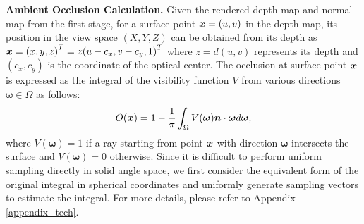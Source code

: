 \documentclass{article} %
\begin{document}
\textbf{Ambient Occlusion Calculation.}\label{occ} Given the rendered depth map and normal map from the first stage, for a surface point ${\bm{x}} =(u,v)$ in the depth map, its position in the view space $(X, Y, Z)$ can be obtained from its depth as ${\bm{x}}={(x,y,z)}^T = z{(u-c_x, v-c_y, 1)}^T$
where $z=d(u,v)$ represents its depth and $(c_x,c_y)$ is the coordinate of the optical center. The occlusion at surface point ${\bm{x}}$ is expressed as the integral of the visibility function $V$ from various directions $\bm{\omega} \in \Omega$ as follows:
\begin{equation}\label{intocc}
\setlength\abovedisplayskip{3pt}
\setlength\belowdisplayskip{3pt}
    O(\vx)=1-\frac{1}{\pi}\int_{\Omega} V(\boldsymbol{\omega}) \vn\cdot\boldsymbol{\omega} d \boldsymbol{\omega},
\end{equation}
where $V(\bm{\omega}) = 1$ if a ray starting from point ${\bm{x}}$ with direction $\bm{\omega}$ intersects the surface and $V(\bm{\omega}) = 0$ otherwise. Since it is difficult to perform uniform sampling directly in solid angle space, we first consider the equivalent form of the original integral in spherical coordinates and uniformly generate sampling vectors to estimate the integral. For more details, please refer to Appendix \ref{appendix_tech}.
\end{document}
